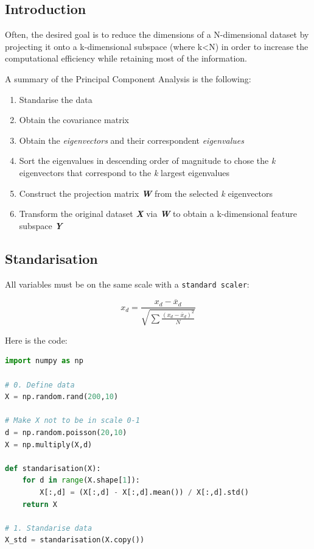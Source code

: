 \subsection{Introduction}

Often, the desired goal is to reduce the dimensions of a N-dimensional dataset by projecting it onto a k-dimensional subspace (where k\textless N) in order to increase the computational efficiency while retaining most of the information.

A summary of the Principal Component Analysis is the following:
\begin{enumerate}
    \item Standarise the data
    \item Obtain the covariance matrix
    \item Obtain the \emph{eigenvectors} and their correspondent \emph{eigenvalues}
    \item Sort the eigenvalues in descending order of magnitude to chose the \emph{k} eigenvectors that correspond to the \emph{k} largest eigenvalues
    \item Construct the projection matrix \emph{\textbf{W}} from the selected \emph{k} eigenvectors
    \item Transform the original dataset \emph{\textbf{X}} via \emph{\textbf{W}} to obtain a k-dimensional feature subspace \emph{\textbf{Y}}
\end{enumerate}

\subsection{Standarisation}
All variables must be on the same scale with a \texttt{standard scaler}:

$$
x_d = \frac{x_d - \overline{x}_d}{\sqrt{
\sum \frac{(x_d - \overline{x}_d)^2}{N}}}
$$

Here is the code:
\begin{lstlisting}[language=Python]
import numpy as np

# 0. Define data
X = np.random.rand(200,10)

# Make X not to be in scale 0-1
d = np.random.poisson(20,10)
X = np.multiply(X,d)

def standarisation(X):
    for d in range(X.shape[1]):
        X[:,d] = (X[:,d] - X[:,d].mean()) / X[:,d].std()
    return X

# 1. Standarise data
X_std = standarisation(X.copy())
\end{lstlisting}

